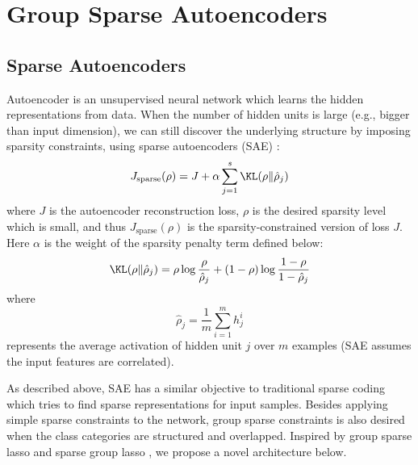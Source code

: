 

\section{Group Sparse Autoencoders}
\label{sec:GSA}

\subsection{Sparse Autoencoders}
Autoencoder \cite{NIPS2006_3048} is an unsupervised neural network which learns the hidden representations from data. %
When the number of hidden units is large %
(e.g., bigger than input dimension),
we can still discover the underlying structure by imposing sparsity constraints, %
using sparse autoencoders (SAE) \cite{andrew_sparse}:%
\begin{equation}\label{eq:loss_sparse}
    J_\text{sparse}(\rho) = J + \alpha \sum_{j=1}^s \KL(\rho \| \hat{\rho}_j)
\end{equation}
where $J$ is the autoencoder reconstruction loss, 
$\rho$ is the desired sparsity level which is small,
and thus $J_\text{sparse}(\rho)$ is the sparsity-constrained version of loss $J$.
Here $\alpha$ is the weight of the sparsity penalty term defined below:
\begin{equation}\label{eq:KL_sparse}
    \KL(\rho \| \hat{\rho}_j)=  \rho\log\frac{\rho}{\hat{\rho}_j} + (1-\rho)\log\frac{1-\rho}{1-\hat{\rho}_j}
\end{equation}
where \[\hat{\rho}_j = \frac{1}{m}\sum_{i=1}^m h_j^i\] represents the average activation of hidden unit $j$
over $m$ examples  (SAE assumes the input features are correlated). %




As described above, SAE has a similar objective to traditional sparse coding which tries to find sparse representations for input samples. 
Besides applying simple sparse constraints to the network,
group sparse constraints is also desired when the class categories are structured and overlapped.  
Inspired by group sparse lasso \cite{Yuan06modelselection} and sparse group lasso \cite{Simon13asparse-group}, we propose a novel architecture below.

